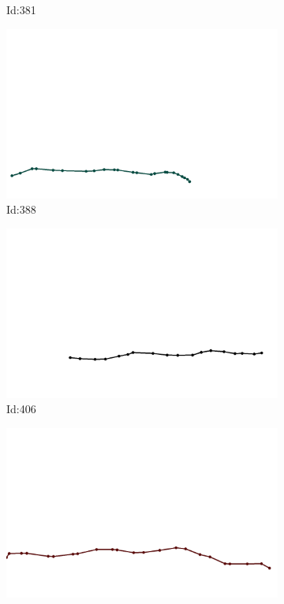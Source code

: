 \documentclass[12pt,twoside]{report}
\begin{document}
\begin{figure}
\begin{subfigure}[b]{0.20\textwidth}
\caption{Id:381}
\end{subfigure}
\begin{subfigure}[b]{0.20\textwidth}
\centering
\includegraphics[width=\textwidth]{../trajectories/388.png}
\caption{Id:388}
\end{subfigure}
\begin{subfigure}[b]{0.20\textwidth}
\centering
\includegraphics[width=\textwidth]{../trajectories/406.png}
\caption{Id:406}
\end{subfigure}
\begin{subfigure}[b]{0.20\textwidth}
\centering
\includegraphics[width=\textwidth]{../trajectories/488.png}

\end{subfigure}
\end{figure}
\end{document}
